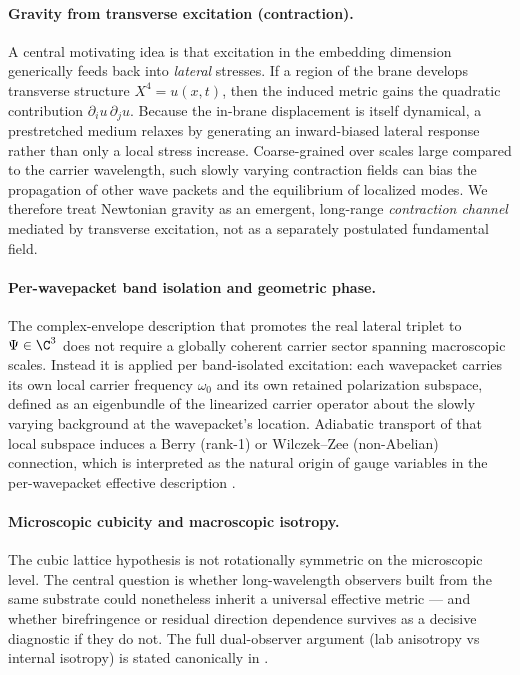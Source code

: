\paragraph{Gravity from transverse excitation (contraction).}
A central motivating idea is that excitation in the embedding dimension generically feeds back into
\emph{lateral} stresses.
If a region of the brane develops transverse structure $X^4=u(x,t)$, then the induced metric gains the quadratic
contribution $\partial_i u\,\partial_j u$.
Because the in-brane displacement is itself dynamical, a prestretched medium relaxes by generating an inward-biased
lateral response rather than only a local stress increase.
Coarse-grained over scales large compared to the carrier wavelength, such slowly varying contraction fields can bias the
propagation of other wave packets and the equilibrium of localized modes.
We therefore treat Newtonian gravity as an emergent, long-range \emph{contraction channel} mediated by transverse
excitation, not as a separately postulated fundamental field.

\paragraph{Per-wavepacket band isolation and geometric phase.}
The complex-envelope description that promotes the real lateral triplet to $\Psi\in\C^3$ does not require a
globally coherent carrier sector spanning macroscopic scales.
Instead it is applied per band-isolated excitation: each wavepacket carries its own local carrier frequency
$\omega_0$ and its own retained polarization subspace, defined as an eigenbundle of the linearized carrier
operator about the slowly varying background at the wavepacket's location.
Adiabatic transport of that local subspace induces a Berry (rank-1) or Wilczek--Zee (non-Abelian) connection,
which is interpreted as the natural origin of gauge variables in the per-wavepacket effective description
\citep{Pancharatnam1956,Berry1984,WilczekZee1984,Bliokh2015SpinOrbit,Cisowski2022}.

\paragraph{Microscopic cubicity and macroscopic isotropy.}
The cubic lattice hypothesis is not rotationally symmetric on the microscopic level.
The central question is whether long-wavelength observers built from the same substrate could nonetheless inherit a
universal effective metric --- and whether birefringence or residual direction dependence survives as a decisive diagnostic
if they do not.
The full dual-observer argument (lab anisotropy vs internal isotropy) is stated canonically in .

